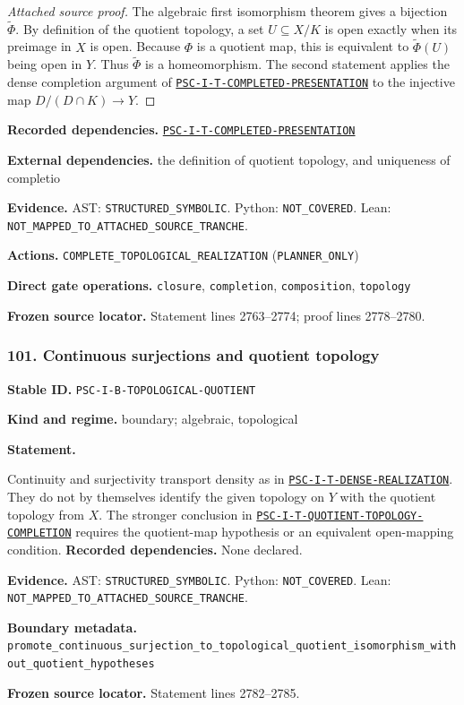 \documentclass[a4paper,11pt]{article}
\newcommand{\field}[2]{\noindent\textbf{#1.} #2\par}
\begin{document}
\begin{proof}[Attached source proof]
The algebraic first isomorphism theorem gives a bijection $\widetilde\Phi$.  By definition of the quotient topology, a set $U\subseteq X/K$ is open exactly when its preimage in $X$ is open.  Because $\Phi$ is a quotient map, this is equivalent to $\widetilde\Phi(U)$ being open in $Y$.  Thus $\widetilde\Phi$ is a homeomorphism.  The second statement applies the dense completion argument of \hyperref[rec:PSC-I-T-COMPLETED-PRESENTATION]{\nolinkurl{PSC-I-T-COMPLETED-PRESENTATION}} to the injective map $D/(D\cap K)\to Y$.
\end{proof}
\field{Recorded dependencies}{\hyperref[rec:PSC-I-T-COMPLETED-PRESENTATION]{\nolinkurl{PSC-I-T-COMPLETED-PRESENTATION}}}
\field{External dependencies}{the definition of quotient topology, and uniqueness of completio}
\field{Evidence}{AST: \nolinkurl{STRUCTURED_SYMBOLIC}. Python: \nolinkurl{NOT_COVERED}. Lean: \nolinkurl{NOT_MAPPED_TO_ATTACHED_SOURCE_TRANCHE}.}
\field{Actions}{\nolinkurl{COMPLETE_TOPOLOGICAL_REALIZATION} (\nolinkurl{PLANNER_ONLY})}
\field{Direct gate operations}{\nolinkurl{closure}, \nolinkurl{completion}, \nolinkurl{composition}, \nolinkurl{topology}}
\field{Frozen source locator}{Statement lines 2763--2774; proof lines 2778--2780.}
\subsubsection*{101. Continuous surjections and quotient topology}
\label{rec:PSC-I-B-TOPOLOGICAL-QUOTIENT}
\field{Stable ID}{\nolinkurl{PSC-I-B-TOPOLOGICAL-QUOTIENT}}
\field{Kind and regime}{boundary; algebraic, topological}
\textbf{Statement.}\par
Continuity and surjectivity transport density as in \hyperref[rec:PSC-I-T-DENSE-REALIZATION]{\nolinkurl{PSC-I-T-DENSE-REALIZATION}}.  They do not by themselves identify the given topology on $Y$ with the quotient topology from $X$.  The stronger conclusion in \hyperref[rec:PSC-I-T-QUOTIENT-TOPOLOGY-COMPLETION]{\nolinkurl{PSC-I-T-QUOTIENT-TOPOLOGY-COMPLETION}} requires the quotient-map hypothesis or an equivalent open-mapping condition.
\field{Recorded dependencies}{None declared.}
\field{Evidence}{AST: \nolinkurl{STRUCTURED_SYMBOLIC}. Python: \nolinkurl{NOT_COVERED}. Lean: \nolinkurl{NOT_MAPPED_TO_ATTACHED_SOURCE_TRANCHE}.}
\field{Boundary metadata}{\nolinkurl{promote_continuous_surjection_to_topological_quotient_isomorphism_without_quotient_hypotheses}}
\field{Frozen source locator}{Statement lines 2782--2785.}
\end{document}
